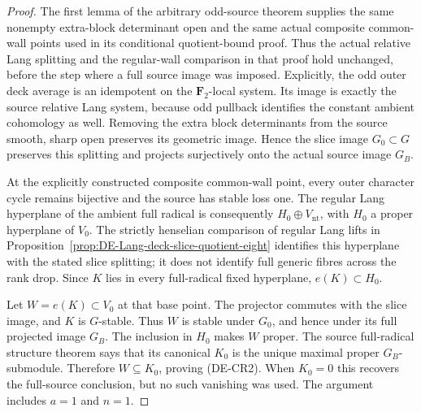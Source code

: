 \begin{proof}
The first lemma of the arbitrary odd-source theorem supplies
the same nonempty extra-block determinant open and the same
actual composite common-wall points used in its conditional
quotient-bound proof. Thus the actual relative Lang splitting
and the regular-wall comparison in that proof hold unchanged,
before the step where a full source image was imposed.
Explicitly, the odd outer deck average is an idempotent on the
\(\mathbf F_2\)-local system. Its image is exactly the source
relative Lang system, because odd pullback identifies the constant
ambient cohomology as well. Removing the extra block determinants
from the source smooth, sharp open preserves its geometric image.
Hence the slice image \(G_0\subset G\) preserves this splitting
and projects surjectively onto the actual source image \(G_B\).

At the explicitly constructed composite common-wall point, every
outer character cycle remains bijective and the source has stable
loss one. The regular Lang hyperplane of the ambient full radical
is consequently \(H_0\oplus V_{\mathrm{nt}}\), with \(H_0\)
a proper hyperplane of \(V_0\). The strictly henselian comparison
of regular Lang lifts in
Proposition~\ref{prop:DE-Lang-deck-slice-quotient-eight} identifies
this hyperplane with the stated slice splitting; it does not
identify full generic fibres across the rank drop. Since \(K\)
lies in every full-radical fixed hyperplane, \(e(K)\subset H_0\).

Let \(W=e(K)\subset V_0\) at that base point. The projector
commutes with the slice image, and \(K\) is \(G\)-stable.
Thus \(W\) is stable under \(G_0\), and hence under its full
projected image \(G_B\). The inclusion in \(H_0\) makes \(W\)
proper. The source full-radical structure theorem says that its
canonical \(K_0\) is the unique maximal proper \(G_B\)-submodule.
Therefore \(W\subseteq K_0\), proving (DE-CR2). When \(K_0=0\)
this recovers the full-source conclusion, but no such vanishing
was used. The argument includes \(a=1\) and \(n=1\).
\end{proof}

